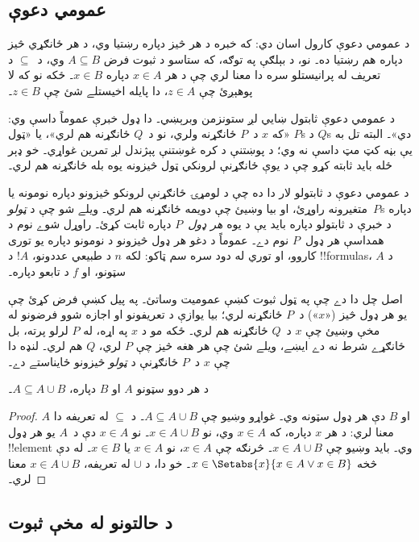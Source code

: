 \documentclass[../../../include/open-logic-section]{subfiles}
\begin{document}
\subsection{عمومي دعوې}

د عمومي دعوې کارول اسان دي: که خبره د
هر څيز دپاره رښتيا وي، د هر ځانګړي څيز
دپاره هم رښتيا ده۔ نو، د بېلګې په توګه،
که ستاسو د ثبوت فرض $A \subseteq B$ وي،
د~$\subseteq$ د تعريف له پرانيستلو سره
دا معنا لري چې د هر $x \in A$ دپاره
$x \in B$۔ ځکه نو که لا پوهېږئ چې
$z \in A$، دا پايله اخيستلے شئ چې
$z \in B$۔

د عمومي دعوې ثابتول ښايي لږ ستونزمن
وبرېښي۔ دا ډول خبرې عموماً داسې وي:
«که $x$ د~$P$ ځانګړنه ولري، نو د~$Q$
ځانګړنه هم لري»، يا «ټول $P$s د $Q$s
دي»۔ البته تل به يې بڼه کټ مټ داسې نه
وي؛ د پوښتنې د کره غوښتنې پېژندل لږ
تمرین غواړي۔ خو ډېر ځله بايد ثابته کړو
چې د يوې ځانګړنې لرونکي ټول څيزونه
يوه بله ځانګړنه هم لري۔

د عمومي دعوې د ثابتولو لار دا ده چې
د لومړۍ ځانګړنې لرونکو څيزونو دپاره
نومونه يا متغيرونه راوړئ، او بيا وښيئ
چې دويمه ځانګړنه هم لري۔ ويلے شو چې
د \emph{ټولو}~$P$s دپاره د خبرې د
ثابتولو دپاره بايد يې د يوه
\emph{هر ډول}~$P$ دپاره ثابت کړئ۔
راوړل شوے نوم د همداسې هر ډول~$P$
نوم دے۔ عموماً د دغو هر ډول څيزونو
د نومونو دپاره يو توری کاروو، او
توري له دود سره سم ټاکو: لکه $n$
د طبيعي عددونو، $!A$ د !!{formula}s،
$A$ د سټونو، او $f$ د تابعو دپاره۔

اصل چل دا دے چې په ټول ثبوت کښې
عموميت وساتئ۔ په پيل کښې فرض کړئ چې
يو هر ډول څيز («$x$») د~$P$
ځانګړنه لري؛ بيا يوازې د تعريفونو
او اجازه شوو فرضونو له مخې وښيئ
چې $x$ د~$Q$ ځانګړنه هم لري۔
ځکه مو د $x$ په اړه، له $P$ لرلو
پرته، بل ځانګړے شرط نه دے ايښے،
ويلے شئ چې هر هغه څيز چې $P$
لري، $Q$ هم لري۔ لنډه دا چې $x$
د~$P$ ځانګړنې د \emph{ټولو}
څيزونو ځايناستے دے۔

\begin{prop}
  د هر دوو سټونو $A$ او $B$ دپاره، $A \subseteq A \cup B$۔
\end{prop}

\begin{proof}
  $A$ او $B$ دې هر ډول سټونه وي۔ غواړو وښيو چې $A
  \subseteq A \cup B$۔ د $\subseteq$ له تعريفه دا
  معنا لري: د هر $x$ دپاره، که $x \in A$ وي، نو
  $x \in A \cup B$۔ نو $x \in A$ دې د~$A$ يو
  هر ډول !!{element} وي۔ بايد وښيو چې $x \in A
  \cup B$۔ څرنګه چې $x \in A$، نو $x \in A$
  يا $x \in B$۔ له دې څخه $x \in
  \Setabs{x}{x \in A \lor x \in B}$۔ خو دا،
  د $\cup
  $ له تعريفه، $x \in A \cup B$ معنا لري۔
\end{proof}

\subsection{د حالتونو له مخې ثبوت}
\end{document}
